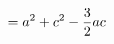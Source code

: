 \documentclass[preview]{standalone}
\begin{document}
\begin{align*}
\special{dvisvgm:raw <g id='unique000'>}=a^2+c^2-\frac{3}{2}ac\special{dvisvgm:raw </g>}
\end{align*}
\end{document}
